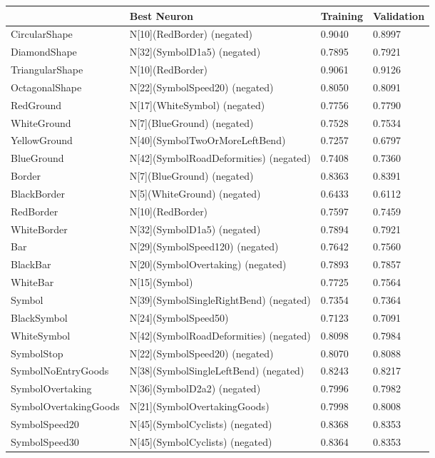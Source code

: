 \begin{tabular}{llll}
\toprule
 & Best Neuron & Training & Validation \\
\midrule
CircularShape & N[10](RedBorder) (negated) & 0.9040 & 0.8997 \\
DiamondShape & N[32](SymbolD1a5) (negated) & 0.7895 & 0.7921 \\
TriangularShape & N[10](RedBorder) & 0.9061 & 0.9126 \\
OctagonalShape & N[22](SymbolSpeed20) (negated) & 0.8050 & 0.8091 \\
RedGround & N[17](WhiteSymbol) (negated) & 0.7756 & 0.7790 \\
WhiteGround & N[7](BlueGround) (negated) & 0.7528 & 0.7534 \\
YellowGround & N[40](SymbolTwoOrMoreLeftBend) & 0.7257 & 0.6797 \\
BlueGround & N[42](SymbolRoadDeformities) (negated) & 0.7408 & 0.7360 \\
Border & N[7](BlueGround) (negated) & 0.8363 & 0.8391 \\
BlackBorder & N[5](WhiteGround) (negated) & 0.6433 & 0.6112 \\
RedBorder & N[10](RedBorder) & 0.7597 & 0.7459 \\
WhiteBorder & N[32](SymbolD1a5) (negated) & 0.7894 & 0.7921 \\
Bar & N[29](SymbolSpeed120) (negated) & 0.7642 & 0.7560 \\
BlackBar & N[20](SymbolOvertaking) (negated) & 0.7893 & 0.7857 \\
WhiteBar & N[15](Symbol) & 0.7725 & 0.7564 \\
Symbol & N[39](SymbolSingleRightBend) (negated) & 0.7354 & 0.7364 \\
BlackSymbol & N[24](SymbolSpeed50) & 0.7123 & 0.7091 \\
WhiteSymbol & N[42](SymbolRoadDeformities) (negated) & 0.8098 & 0.7984 \\
SymbolStop & N[22](SymbolSpeed20) (negated) & 0.8070 & 0.8088 \\
SymbolNoEntryGoods & N[38](SymbolSingleLeftBend) (negated) & 0.8243 & 0.8217 \\
SymbolOvertaking & N[36](SymbolD2a2) (negated) & 0.7996 & 0.7982 \\
SymbolOvertakingGoods & N[21](SymbolOvertakingGoods) & 0.7998 & 0.8008 \\
SymbolSpeed20 & N[45](SymbolCyclists) (negated) & 0.8368 & 0.8353 \\
SymbolSpeed30 & N[45](SymbolCyclists) (negated) & 0.8364 & 0.8353 \\

\end{tabular}
